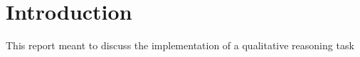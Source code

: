 \cite{Bredeweg06garp3-}

\section{Introduction}

This report meant to discuss the implementation of a qualitative reasoning task